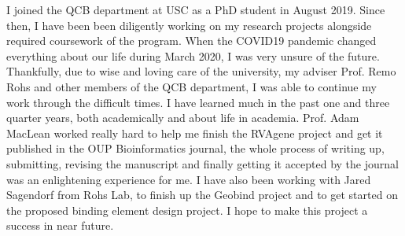 I joined the QCB department at USC as a PhD student in August 2019. Since then, I have been been diligently
working on my research projects alongside required coursework of the program. When the COVID19
pandemic changed everything about our life during March 2020, I was very unsure of the future.
Thankfully, due to wise and loving care of the university, my adviser Prof. Remo Rohs and other members of the QCB
department, I was able to continue my work through the difficult times. I have learned much in the
past one and three quarter years, both academically and about life in academia. Prof. Adam MacLean
worked really hard to help me finish the RVAgene project and get it published in the  OUP
Bioinformatics journal, the whole process of writing up, submitting, revising the manuscript and
finally getting it accepted by the journal was an enlightening experience for me. I have also been
working with Jared Sagendorf from Rohs Lab, to finish up the Geobind project and to
get started on the proposed binding element design project.  I hope to make this project a success
in near future. 

